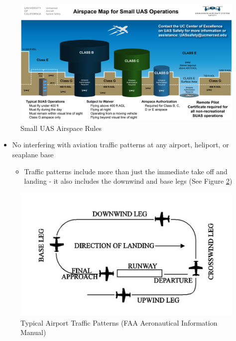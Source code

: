 \documentclass[
]{book}
\providecommand{\tightlist}{%
  \setlength{\itemsep}{0pt}\setlength{\parskip}{0pt}}
\begin{document}
\begin{figure}

{\centering \includegraphics[width=0.9\linewidth]{images/SUAS_airspace_map} 

}

\caption{Small UAS Airspace Rules}\label{fig:SUAS-airspace-regs}
\end{figure}

\begin{itemize}
\tightlist
\item
  No interfering with aviation traffic patterns at any airport, heliport, or seaplane base

  \begin{itemize}
  \tightlist
  \item
    Traffic patterns include more than just the immediate take off and landing - it also includes the downwind and base legs (See Figure \ref{fig:traffic-patterns})
  \end{itemize}
\end{itemize}

\begin{figure}

{\centering \includegraphics[width=0.9\linewidth]{images/faa_traffic_pattern} 

}

\caption{Typical Airport Traffic Patterns (FAA Aeronautical Information Manual)}\label{fig:traffic-patterns}
\end{figure}
\end{document}
